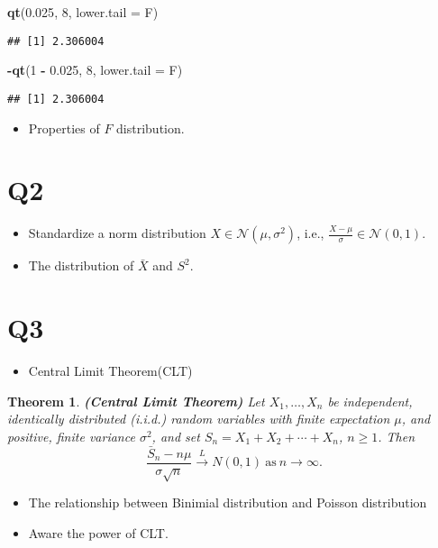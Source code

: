 \documentclass[
]{book}
\newenvironment{Shaded}{\begin{snugshade}}{\end{snugshade}}
\newcommand{\DataTypeTok}[1]{\textcolor[rgb]{0.13,0.29,0.53}{#1}}
\newcommand{\DecValTok}[1]{\textcolor[rgb]{0.00,0.00,0.81}{#1}}
\newcommand{\FloatTok}[1]{\textcolor[rgb]{0.00,0.00,0.81}{#1}}
\newcommand{\KeywordTok}[1]{\textcolor[rgb]{0.13,0.29,0.53}{\textbf{#1}}}
\newcommand{\NormalTok}[1]{#1}
\newcommand{\OperatorTok}[1]{\textcolor[rgb]{0.81,0.36,0.00}{\textbf{#1}}}
\newcommand{\StringTok}[1]{\textcolor[rgb]{0.31,0.60,0.02}{#1}}
\providecommand{\tightlist}{%
  \setlength{\itemsep}{0pt}\setlength{\parskip}{0pt}}
\newtheorem{theorem}{Theorem}[chapter]
\theoremstyle{definition}
\theoremstyle{definition}
\theoremstyle{definition}
\theoremstyle{remark}
\begin{document}
\begin{Shaded}
\begin{Highlighting}[]
\KeywordTok{qt}\NormalTok{(}\FloatTok{0.025}\NormalTok{, }\DecValTok{8}\NormalTok{, }\DataTypeTok{lower.tail =}\NormalTok{ F)}
\end{Highlighting}
\end{Shaded}

\begin{verbatim}
## [1] 2.306004
\end{verbatim}

\begin{Shaded}
\begin{Highlighting}[]
\OperatorTok{{-}}\KeywordTok{qt}\NormalTok{(}\DecValTok{1} \OperatorTok{{-}}\StringTok{ }\FloatTok{0.025}\NormalTok{, }\DecValTok{8}\NormalTok{, }\DataTypeTok{lower.tail =}\NormalTok{ F)}
\end{Highlighting}
\end{Shaded}

\begin{verbatim}
## [1] 2.306004
\end{verbatim}

\begin{itemize}
\tightlist
\item
  Properties of \(F\) distribution.
\end{itemize}

\hypertarget{q2}{%
\section{Q2}\label{q2}}

\begin{itemize}
\item
  Standardize a norm distribution \(X\in\mathcal{N}(\mu,\sigma^2)\), i.e., \(\frac{X-\mu}{\sigma}\in\mathcal{N}(0,1)\).
\item
  The distribution of \(\bar X\) and \(S^2\).
\end{itemize}

\hypertarget{q3}{%
\section{Q3}\label{q3}}

\begin{itemize}
\tightlist
\item
  Central Limit Theorem(CLT)
\end{itemize}

\begin{theorem}
\protect\hypertarget{thm:clt}{}{\label{thm:clt} }\textbf{(Central Limit Theorem)} Let \(X_1,\ldots,X_n\) be independent, identically
distributed (i.i.d.) random variables with finite expectation \(\mu\), and
positive, finite variance \(\sigma^2\), and set \(S_n=X_1 + X_2 + \cdots + X_n\), \(n \ge 1\). Then
\[
    \frac{\bar{S}_n - n\mu}{\sigma \sqrt{n}}\xrightarrow{L} N(0, 1)
    ~\mathrm{as}~n\rightarrow\infty.
\]
\end{theorem}

\begin{itemize}
\item
  The relationship between Binimial distribution and Poisson distribution
\item
  Aware the power of CLT.
\end{itemize}

  
\end{document}
